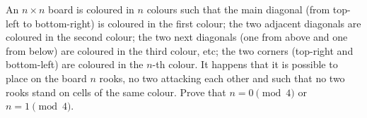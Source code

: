 An $n\times n$ board is coloured in $n$ colours such that the main diagonal (from top-left to bottom-right) is coloured in the first colour; the two adjacent diagonals are coloured in the second colour; the two next diagonals (one from above and one from below) are coloured in the third colour, etc; the two corners (top-right and bottom-left) are coloured in the $n$-th colour. It happens that it is possible to place on the board $n$ rooks, no two attacking each other and such that no two rooks stand on cells of the same colour. Prove that $n=0\pmod{4}$ or $n=1\pmod{4}$.